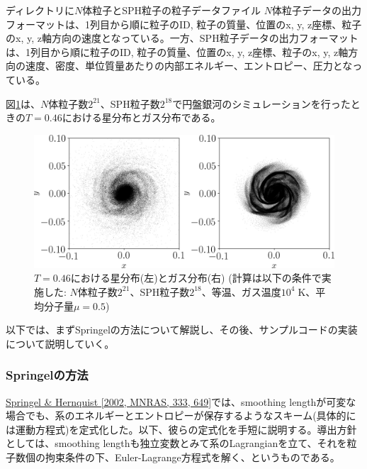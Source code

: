 \label{s3sec:NbodySPH_result_analysis}
ディレクトリに$N$体粒子とSPH粒子の粒子データファイル
$N$体粒子データの出力フォーマットは、1列目から順に粒子のID, 粒子の質量、位置のx, y, z座標、粒子のx, y, z軸方向の速度となっている。一方、SPH粒子データの出力フォーマットは、1列目から順に粒子のID, 粒子の質量、位置のx, y, z座標、粒子のx, y, z軸方向の速度、密度、単位質量あたりの内部エネルギー、エントロピー、圧力となっている。

図\ref{fig:nbodysph}は、$N$体粒子数$2^{21}$、SPH粒子数$2^{18}$で円盤銀河のシミュレーションを行ったときの$T=0.46$における星分布とガス分布である。

\begin{figure}[h]
\centering
\includegraphics[width=\linewidth]{./fig/nbodysph_t046.png}
\caption{$T=0.46$における星分布(左)とガス分布(右) (計算は以下の条件で実施した: $N$体粒子数$2^{21}$、SPH粒子数$2^{18}$、等温、ガス温度$10^{4}\;\mathrm{K}$、平均分子量$\mu=0.5$)}
\label{fig:nbodysph}
\end{figure}


以下では、まずSpringelの方法について解説し、その後、サンプルコードの実装について説明していく。


\subsubsection{Springelの方法}
\label{subsubsec:Springel_scheme}
\href{https://doi.org/10.1046/j.1365-8711.2002.05445.x}{Springel \& Hernquist [2002, MNRAS, 333, 649]}では、smoothing lengthが可変な場合でも、系のエネルギーとエントロピーが保存するようなスキーム(具体的には運動方程式)を定式化した。以下、彼らの定式化を手短に説明する。導出方針としては、smoothing lengthも独立変数とみて系のLagrangianを立て、それを粒子数個の拘束条件の下、Euler-Lagrange方程式を解く、というものである。

